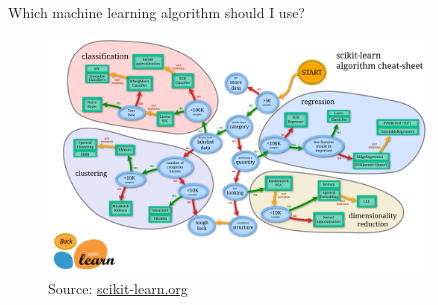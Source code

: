 \documentclass[pdf]{beamer}
\begin{document}
\begin{frame}{Which machine learning algorithm should I use?}
\begin{figure}	
	\begin{center}
		\includegraphics[width=0.9\textwidth]{scikitFlowChart.png}
		\caption{Source: \href{http://scikit-learn.org/stable/tutorial/machine_learning_map/index.html}{scikit-learn.org}}
	\end{center}
\end{figure}
\end{frame}


\end{document}
